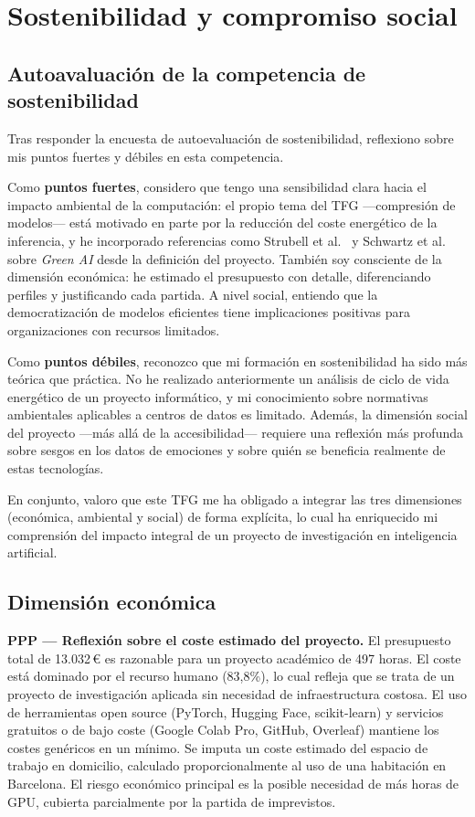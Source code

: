 \documentclass[11pt, a4paper]{article}
\begin{document}
\section{Sostenibilidad y compromiso social}
\label{sec:sostenibilidad}

\subsection{Autoavaluación de la competencia de sostenibilidad}

Tras responder la encuesta de autoevaluación de sostenibilidad, reflexiono sobre mis puntos fuertes y débiles en esta competencia.

Como \textbf{puntos fuertes}, considero que tengo una sensibilidad clara hacia el impacto ambiental de la computación: el propio tema del TFG ---compresión de modelos--- está motivado en parte por la reducción del coste energético de la inferencia, y he incorporado referencias como Strubell et al.\ \cite{strubell2019energy} y Schwartz et al.\ \cite{schwartz2020green} sobre \textit{Green AI} desde la definición del proyecto. También soy consciente de la dimensión económica: he estimado el presupuesto con detalle, diferenciando perfiles y justificando cada partida. A nivel social, entiendo que la democratización de modelos eficientes tiene implicaciones positivas para organizaciones con recursos limitados.

Como \textbf{puntos débiles}, reconozco que mi formación en sostenibilidad ha sido más teórica que práctica. No he realizado anteriormente un análisis de ciclo de vida energético de un proyecto informático, y mi conocimiento sobre normativas ambientales aplicables a centros de datos es limitado. Además, la dimensión social del proyecto ---más allá de la accesibilidad--- requiere una reflexión más profunda sobre sesgos en los datos de emociones y sobre quién se beneficia realmente de estas tecnologías.

En conjunto, valoro que este TFG me ha obligado a integrar las tres dimensiones (económica, ambiental y social) de forma explícita, lo cual ha enriquecido mi comprensión del impacto integral de un proyecto de investigación en inteligencia artificial.

\subsection{Dimensión económica}

\textbf{PPP --- Reflexión sobre el coste estimado del proyecto.} El presupuesto total de 13.032\,\euro{} es razonable para un proyecto académico de 497 horas. El coste está dominado por el recurso humano (83,8\%), lo cual refleja que se trata de un proyecto de investigación aplicada sin necesidad de infraestructura costosa. El uso de herramientas open source (PyTorch, Hugging Face, scikit-learn) y servicios gratuitos o de bajo coste (Google Colab Pro, GitHub, Overleaf) mantiene los costes genéricos en un mínimo. Se imputa un coste estimado del espacio de trabajo en domicilio, calculado proporcionalmente al uso de una habitación en Barcelona. El riesgo económico principal es la posible necesidad de más horas de GPU, cubierta parcialmente por la partida de imprevistos.
\end{document}
